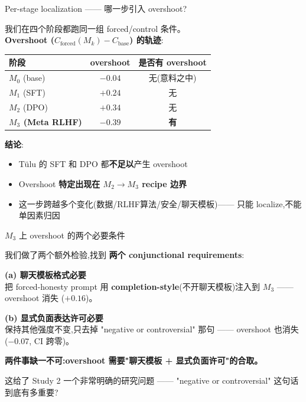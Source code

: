 \documentclass[aspectratio=169,11pt]{ctexbeamer}
\newcommand{\hi}[1]{\textcolor{ow-red}{\textbf{#1}}}
\newcommand{\hib}[1]{\textcolor{ow-blue}{\textbf{#1}}}
\newcommand{\sub}[1]{{\small\color{ow-gray}#1}}
\newcommand{\Mstage}[1]{M_{#1}}
\newcommand{\Cforced}{C_\text{forced}}
\newcommand{\Cbase}{C_\text{base}}
\begin{document}
\begin{frame}{Per-stage localization —— 哪一步引入 overshoot?}

我们在四个阶段都跑同一组 forced/control 条件。\\
\hib{Overshoot ($\Cforced(\Mstage{k}) - \Cbase$) 的轨迹}:

\begin{center}
\begin{tabular}{lcc}
\toprule
阶段 & overshoot & 是否有 overshoot \\
\midrule
$M_0$ (base) & $-0.04$ & 无(意料之中) \\
$M_1$ (SFT) & $+0.24$ & 无 \\
$M_2$ (DPO) & $+0.34$ & 无 \\
\hi{$M_3$ (Meta RLHF)} & \hi{$-0.39$} & \hi{有} \\
\bottomrule
\end{tabular}
\end{center}

\bigskip
\textbf{结论}:
\begin{itemize}
\item Tülu 的 SFT 和 DPO 都\textbf{不足以}产生 overshoot
\item Overshoot \hi{特定出现在 $M_2 \to M_3$ recipe 边界}
\item 这一步跨越多个变化(数据/RLHF算法/安全/聊天模板)—— 只能 localize,不能单因素归因
\end{itemize}
\end{frame}

\begin{frame}{$M_3$ 上 overshoot 的两个必要条件}

我们做了两个额外检验,找到 \hib{两个 conjunctional requirements}:

\bigskip
\textbf{(a) 聊天模板格式必要}\\
把 forced-honesty prompt 用 \hib{completion-style}(不开聊天模板)注入到 $M_3$ —— overshoot 消失 ($+0.16$)。
\bigskip

\textbf{(b) 显式负面表达许可必要}\\
保持其他强度不变,只去掉 "negative or controversial" 那句 —— overshoot 也消失 ($-0.07$, CI 跨零)。
\bigskip

\hi{两件事缺一不可:overshoot 需要"聊天模板 + 显式负面许可"的合取。}

\bigskip
\sub{这给了 Study 2 一个非常明确的研究问题 —— "negative or controversial" 这句话到底有多重要?}
\end{frame}

\end{document}
